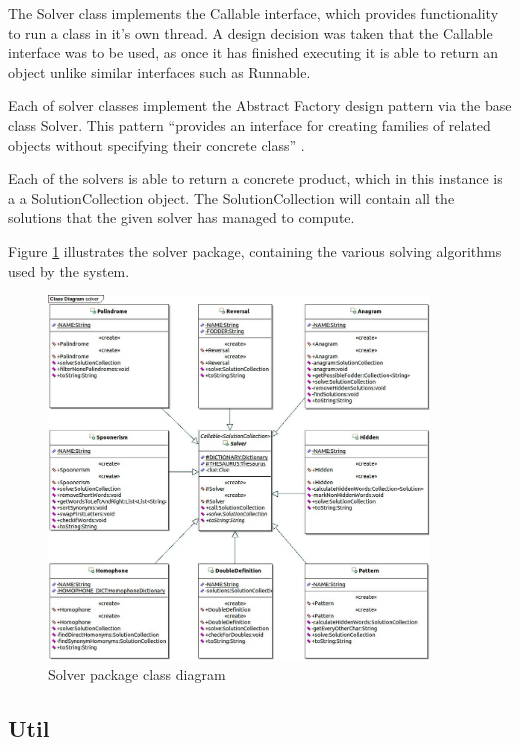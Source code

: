 The Solver class implements the Callable interface, which provides functionality
to run a class in it's own thread. A design decision was taken that the Callable
interface was to be used, as once it has finished executing it is able to return
an object unlike similar interfaces such as Runnable.

Each of solver classes implement the Abstract Factory design pattern via the 
base class Solver. This pattern ``provides an interface for creating families of
related objects without specifying their concrete class'' \citep{gof}.

Each of the solvers is able to return a concrete product, which in this instance
is a a SolutionCollection object. The SolutionCollection will contain all the 
solutions that the given solver has managed to compute. 

Figure \ref{fig:solver_package} illustrates the solver package, containing the
various solving algorithms used by the system.

\begin{figure}[H]
  \centering
  \includegraphics[width=0.9\textwidth]{design/class/solver.jpg}
  \caption{Solver package class diagram}
  \label{fig:solver_package}
\end{figure}


\subsection{Util}
\label{sub:util}

